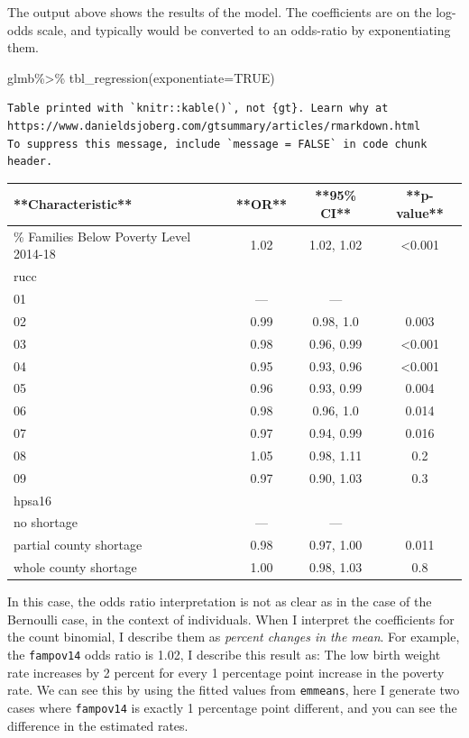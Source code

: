 \documentclass[
  letterpaper,
  DIV=11,
  numbers=noendperiod]{scrreprt}
\newenvironment{Shaded}{\begin{snugshade}}{\end{snugshade}}
\newcommand{\AttributeTok}[1]{\textcolor[rgb]{0.40,0.45,0.13}{#1}}
\newcommand{\ConstantTok}[1]{\textcolor[rgb]{0.56,0.35,0.01}{#1}}
\newcommand{\FunctionTok}[1]{\textcolor[rgb]{0.28,0.35,0.67}{#1}}
\newcommand{\NormalTok}[1]{\textcolor[rgb]{0.00,0.23,0.31}{#1}}
\newcommand{\SpecialCharTok}[1]{\textcolor[rgb]{0.37,0.37,0.37}{#1}}
\begin{document}
The output above shows the results of the model. The coefficients are on
the log-odds scale, and typically would be converted to an odds-ratio by
exponentiating them.

\begin{Shaded}
\begin{Highlighting}[]
\NormalTok{glmb}\SpecialCharTok{\%\textgreater{}\%}
  \FunctionTok{tbl\_regression}\NormalTok{(}\AttributeTok{exponentiate=}\ConstantTok{TRUE}\NormalTok{)}
\end{Highlighting}
\end{Shaded}

\begin{verbatim}
Table printed with `knitr::kable()`, not {gt}. Learn why at
https://www.danieldsjoberg.com/gtsummary/articles/rmarkdown.html
To suppress this message, include `message = FALSE` in code chunk header.
\end{verbatim}

\begin{tabular}{l|c|c|c}
\hline
**Characteristic** & **OR** & **95\% CI** & **p-value**\\
\hline
\% Families Below Poverty Level 2014-18 & 1.02 & 1.02, 1.02 & <0.001\\
\hline
rucc &  &  & \\
\hline
01 & — & — & \\
\hline
02 & 0.99 & 0.98, 1.0 & 0.003\\
\hline
03 & 0.98 & 0.96, 0.99 & <0.001\\
\hline
04 & 0.95 & 0.93, 0.96 & <0.001\\
\hline
05 & 0.96 & 0.93, 0.99 & 0.004\\
\hline
06 & 0.98 & 0.96, 1.0 & 0.014\\
\hline
07 & 0.97 & 0.94, 0.99 & 0.016\\
\hline
08 & 1.05 & 0.98, 1.11 & 0.2\\
\hline
09 & 0.97 & 0.90, 1.03 & 0.3\\
\hline
hpsa16 &  &  & \\
\hline
no shortage & — & — & \\
\hline
partial county shortage & 0.98 & 0.97, 1.00 & 0.011\\
\hline
whole county shortage & 1.00 & 0.98, 1.03 & 0.8\\
\hline
\end{tabular}

In this case, the odds ratio interpretation is not as clear as in the
case of the Bernoulli case, in the context of individuals. When I
interpret the coefficients for the count binomial, I describe them as
\emph{percent changes in the mean}. For example, the \texttt{fampov14}
odds ratio is 1.02, I describe this result as: The low birth weight rate
increases by 2 percent for every 1 percentage point increase in the
poverty rate. We can see this by using the fitted values from
\texttt{emmeans}, here I generate two cases where \texttt{fampov14} is
exactly 1 percentage point different, and you can see the difference in
the estimated rates.
\end{document}
